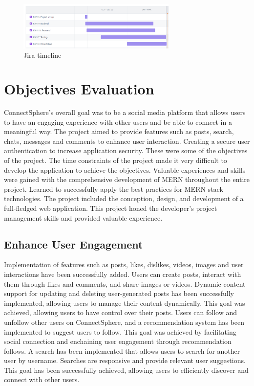 \begin{figure}[h!]
    \centering
    \includegraphics[width=0.7\textwidth]{images/jira.PNG}
    \caption{Jira timeline}
    \label{fig:jira-timeline}
\end{figure}

\section{Objectives Evaluation}
ConnectSphere's overall goal was to be a social media platform that allows users to have an engaging experience with other users and be able to connect in a meaningful way. The project aimed to provide features such as posts, search, chats, messages and comments to enhance user interaction. Creating a secure user authentication to increase application security. These were some of the objectives of the project. The time constraints of the project made it very difficult to develop the application to achieve the objectives. Valuable experiences and skills were gained with the comprehensive development of MERN throughout the entire project. Learned to successfully apply the best practices for MERN stack technologies. The project included the conception, design, and development of a full-fledged web application. This project honed the developer's project management skills and provided valuable experience.


\subsection{Enhance User Engagement}
Implementation of features such as posts, likes, dislikes, videos, images and user interactions have been successfully added. Users can create posts, interact with them through likes and comments, and share images or videos. Dynamic content support for updating and deleting user-generated posts has been successfully implemented, allowing users to manage their content dynamically. This goal was achieved, allowing users to have control over their posts. Users can follow and unfollow other users on ConnectSphere, and a recommendation system has been implemented to suggest users to follow. This goal was achieved by facilitating social connection and enchaining user engagement through recommendation follows. A search has been implemented that allows users to search for another user by username.  Searches are responsive and provide relevant user suggestions. This goal has been successfully achieved, allowing users to efficiently discover and connect with other users. 

